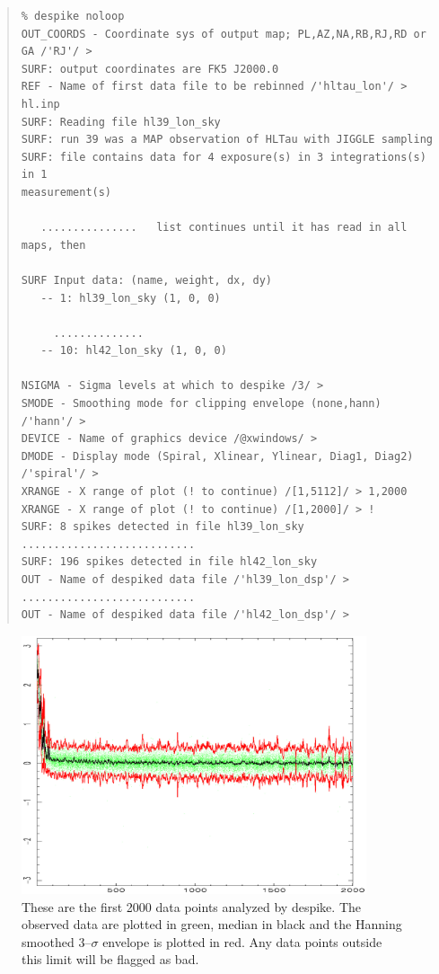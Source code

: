 \documentclass[twoside,11pt]{article}
\newenvironment{myquote}{\begin{quote}\begin{small}}{\end{small}\end{quote}}
\newcommand{\task}[1]{\textsf{#1}}
\newcommand{\desp}{\xref{\task{despike}}{sun216}{DESPIKE}}
\newcommand{\xref}[3]{#1}
\renewcommand{\_}{\texttt{\symbol{95}}}
\begin{document}
\begin{myquote}
\begin{verbatim}
% despike noloop
OUT_COORDS - Coordinate sys of output map; PL,AZ,NA,RB,RJ,RD or GA /'RJ'/ > 
SURF: output coordinates are FK5 J2000.0
REF - Name of first data file to be rebinned /'hltau_lon'/ > hl.inp
SURF: Reading file hl39_lon_sky
SURF: run 39 was a MAP observation of HLTau with JIGGLE sampling
SURF: file contains data for 4 exposure(s) in 3 integrations(s) in 1
measurement(s)

   ...............   list continues until it has read in all maps, then
 
SURF Input data: (name, weight, dx, dy)
   -- 1: hl39_lon_sky (1, 0, 0)

     ..............
   -- 10: hl42_lon_sky (1, 0, 0)
 
NSIGMA - Sigma levels at which to despike /3/ >
SMODE - Smoothing mode for clipping envelope (none,hann) /'hann'/ > 
DEVICE - Name of graphics device /@xwindows/ > 
DMODE - Display mode (Spiral, Xlinear, Ylinear, Diag1, Diag2) /'spiral'/ > 
XRANGE - X range of plot (! to continue) /[1,5112]/ > 1,2000
XRANGE - X range of plot (! to continue) /[1,2000]/ > !
SURF: 8 spikes detected in file hl39_lon_sky
...........................
SURF: 196 spikes detected in file hl42_lon_sky
OUT - Name of despiked data file /'hl39_lon_dsp'/ > 
...........................
OUT - Name of despiked data file /'hl42_lon_dsp'/ > 
\end{verbatim}
\end{myquote}



\begin{figure}
\begin{center}
\includegraphics[width=4in]{sho_fig5.eps}
\caption{These are the first 2000 data points analyzed by \desp. The observed data are plotted in green, median in black and the Hanning smoothed 3--$\sigma$ envelope is plotted in red. Any data points outside this limit will be flagged as bad.}
\label{fig:desp}
\end{center}
\end{figure}
\end{document}
